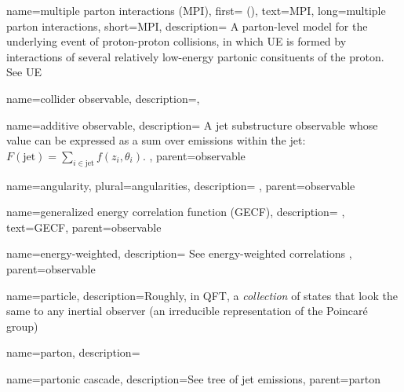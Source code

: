 {
  name=multiple parton interactions (MPI),
  first= (),
  text=MPI,
  long=multiple parton interactions,
  short=MPI,
  description={
      A parton-level model for the underlying event of proton-proton collisions, in which UE is formed by interactions of several relatively low-energy partonic consituents of the proton.
      See UE
    }
}



{
    name=collider observable,
    description={},
}

    {
        name=additive observable,
        description={
            A jet substructure observable whose value can be expressed as a sum over emissions within the jet:
            \(F(\text{jet}) = \sum_{i \in \text{jet}} f(z_i, \theta_i)\).
        },
        parent=observable
    }


    {
        name=angularity,
        plural=angularities,
        description={
        },
        parent=observable
    }

    {
        name=generalized energy correlation function (GECF),
        description={
        },
        text=GECF,
        parent=observable
    }

    {
        name=energy-weighted,
        description={
            See energy-weighted correlations
        },
        parent=observable
    }



{
  name=particle,
  description={Roughly, in QFT, a \textit{collection} of states that look the same to any inertial observer (an irreducible representation of the Poincar\'e group)}
}


{
  name=parton,
  description={}
}

    {
      name=partonic cascade,
      description={See tree of jet emissions},
      parent=parton
    }

